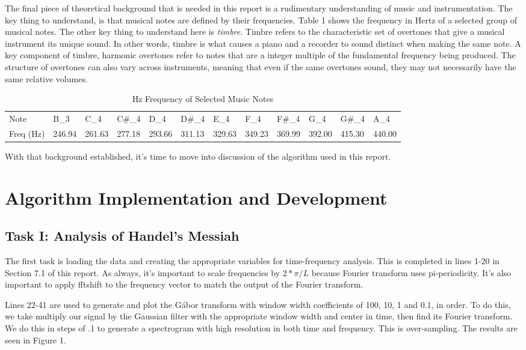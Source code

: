 \documentclass[a4paper,10 pt]{article}
\begin{document}
The final piece of theoretical background that is needed in this report is a rudimentary understanding of music and instrumentation. The key thing to understand, is that musical notes are defined by their frequencies. Table 1 shows the frequency in Hertz of a selected group of musical notes\cite{MTU}. The other key thing to understand here is \emph{timbre}. Timbre refers to the characteristic set of overtones that give a musical instrument its unique sound. In other words, timbre is what causes a piano and a recorder to sound distinct when making the same note. A key component of timbre, harmonic overtones refer to notes that are a integer multiple of the fundamental frequency being produced\cite{MVCC}. The structure of overtones can also vary across instruments, meaning that even if the same overtones sound, they may not necessarily have the same relative volumes.
\begin{table}[]
\begin{tabular}{llllllllllll}
Note      & B_3   & C_4   & C\#_4 & D_4   & D\#_4 & E_4   & F_4   & F\#_4 & G_4   & G\#_4 & A_4 \\
Freq (Hz) & 246.94 & 261.63 & 277.18 & 293.66 & 311.13 & 329.63 & 349.23 & 369.99 & 392.00 & 415.30 & 440.00
\end{tabular}
\caption{Hz Frequency of Selected Music Notes}
\end{table}
With that background established, it's time to move into discussion of the algorithm used in this report.
\section{Algorithm Implementation and Development}
\subsection{Task I: Analysis of Handel's Messiah}
The first task is loading the data and creating the appropriate variables for time-frequency analysis. This is completed in lines 1-20 in Section 7.1 of this report. As always, it's important to scale frequencies by $2*\pi/L$ because Fourier transform uses pi-periodicity. It's also important to apply fftshift to the frequency vector to match the output of the Fourier transform.

Lines 22-41 are used to generate and plot the G\'abor transform with window width coefficients of 100, 10, 1 and 0.1, in order. To do this, we take multiply our signal by the Gaussian filter with the appropriate window width and center in time, then find its Fourier transform. We do this in steps of .1 to generate a spectrogram with high resolution in both time and frequency. This is over-sampling. The results are seen in Figure 1.
\end{document}
